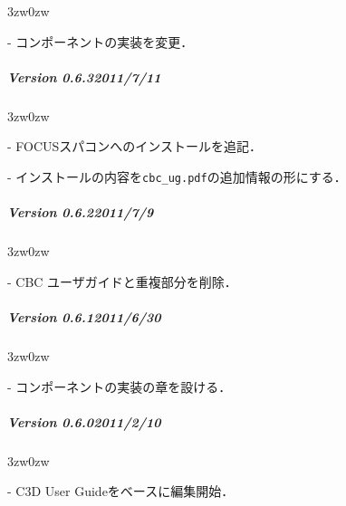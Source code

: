 {\begin{description}
\begin{indentation}{3zw}{0zw}
\item[-] コンポーネントの実装を変更．
\end{indentation}
\end{description}
\vspace{3mm}

%
\subparagraph{Version 0.6.3\hspace{1cm}2011/7/11}

\begin{description}
\begin{indentation}{3zw}{0zw}
\item[-] FOCUSスパコンへのインストールを追記．
\item[-] インストールの内容を\verb|cbc_ug.pdf|の追加情報の形にする．
\end{indentation}
\end{description}
\vspace{3mm}

%
\subparagraph{Version 0.6.2\hspace{1cm}2011/7/9}

\begin{description}
\begin{indentation}{3zw}{0zw}
\item[-] CBC ユーザガイドと重複部分を削除．
\end{indentation}
\end{description}
\vspace{3mm}

%
\subparagraph{Version 0.6.1\hspace{1cm}2011/6/30}

\begin{description}
\begin{indentation}{3zw}{0zw}
\item[-] コンポーネントの実装の章を設ける．
\end{indentation}
\end{description}
\vspace{3mm}

%
\subparagraph{Version 0.6.0\hspace{1cm}2011/2/10}

\begin{description}
\begin{indentation}{3zw}{0zw}
\item[-] C3D User Guideをベースに編集開始．
\end{indentation}
\end{description}

} %